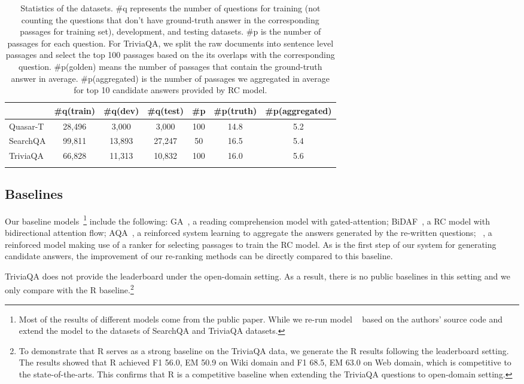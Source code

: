 \documentclass{article} \usepackage{iclr2018_conference,times}
\begin{document}
\begin{table}[]
\centering
\small
\setlength\tabcolsep{3.5pt}
\begin{tabular}{lcccccc}
\toprule
            & \#q(train) & \#q(dev) & \#q(test)  & \#p & \#p(truth) & \#p(aggregated)\\
\midrule
Quasar-T    & 28,496 & 3,000 & 3,000  &  100 & 14.8 & 5.2 \\
SearchQA       & 99,811 & 13,893 & 27,247 & 50 & 16.5 & 5.4 \\
TriviaQA  & 66,828 & 11,313 & 10,832 & 100 & 16.0 & 5.6 \\
\bottomrule
\normalsize
\end{tabular}
\caption{Statistics of the datasets. \#q represents the number of questions for training (not counting the questions that don't have ground-truth answer in the corresponding passages for training set), development, and testing datasets. \#p is the number of passages for each question. For TriviaQA, we split the raw documents into sentence level passages and select the top 100 passages based on the its overlaps with the corresponding question.  \#p(golden) means the number of passages that contain the ground-truth answer in average. \#p(aggregated) is the number of passages we aggregated in average for top 10 candidate answers provided by RC model.}
\label{datasets}
\end{table}

\subsection{Baselines}
Our baseline models~\footnote{ Most of the results of different models come from the public paper. While we re-run model ~\citep{wang2017r} based on the authors' source code and extend the model to the datasets of SearchQA and TriviaQA datasets.} include the following: GA~\citep{dhingra2016gated,dhingra2017quasar}, a reading comprehension model with gated-attention; BiDAF~\citep{seo2016bidirectional}, a RC model with bidirectional attention flow; AQA~\citep{buck2017ask}, a reinforced system learning to aggregate the answers generated by the re-written questions; ~\citep{wang2017r}, a reinforced model making use of a ranker for selecting passages to train the RC model. As  is the first step of our system for generating candidate answers, the improvement of our re-ranking methods can be directly compared to this baseline.

TriviaQA does not provide the leaderboard under the open-domain setting. As a result, there is no public baselines in this setting and we only compare with the R baseline.\footnote{To demonstrate that R serves as a strong baseline on the TriviaQA data, we generate the R results following the leaderboard setting. The results showed that R achieved F1 56.0, EM 50.9 on Wiki domain and F1 68.5, EM 63.0 on Web domain, which is competitive to the state-of-the-arts. This confirms that R is a competitive baseline when extending the TriviaQA questions to open-domain setting.}
\end{document}
